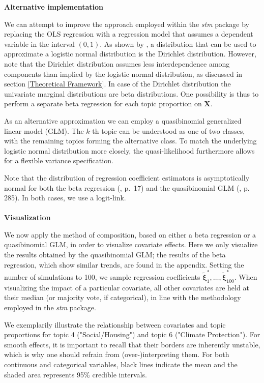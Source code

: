 \noindent \textbf{Alternative implementation} \vspace{10px}

\noindent We can attempt to improve the approach employed within the \textit{stm} package by replacing the OLS regression with a regression model that assumes a dependent variable in the interval $(0,1)$. As shown by \cite{atchison1980logistic}, a distribution that can be used to approximate a logistic normal distribution is the Dirichlet distribution. However, note that the Dirichlet distribution assumes less interdependence among components than implied by the logistic normal distribution, as discussed in section \ref{Theoretical Framework}. In case of the Dirichlet distribution the univariate marginal distributions are beta distributions. One possibility is thus to perform a separate beta regression for each topic proportion on $\boldsymbol{X}$. 

As an alternative approximation we can employ a quasibinomial generalized linear model (GLM). The $k$-th topic can be understood as one of two classes, with the remaining topics forming the alternative class. To match the underlying logistic normal distribution more closely, the quasi-likelihood furthermore allows for a flexible variance specification. 

Note that the distribution of regression coefficient estimators is asymptotically normal for both the beta regression (\citealp{ferrari2004beta}, p.\ 17) and the quasibinomial GLM (\citealp{fahrmeir2007regression}, p. 285). In both cases, we use a logit-link. \\
\\
\noindent \textbf{Visualization} \vspace{10px}

\noindent We now apply the method of composition, based on either a beta regression or a quasibinomial GLM, in order to visualize covariate effects. Here we only visualize the results obtained by the quasibinomial GLM; the results of the beta regression, which show similar trends, are found in the appendix. Setting the number of simulations to 100, we sample regression coefficients $\tilde{\boldsymbol{\xi}}^*_1, \dots, \tilde{\boldsymbol{\xi}}^*_{100}$. When visualizing the impact of a particular covariate, all other covariates are held at their median (or majority vote, if categorical), in line with the methodology employed in the \textit{stm} package.

We exemplarily illustrate the relationship between covariates and topic proportions for topic 4 ("Social/Housing") and topic 6 ("Climate Protection"). For smooth effects, it is important to recall that their borders are inherently unstable, which is why one should refrain from (over-)interpreting them. For both continuous and categorical variables, black lines indicate the mean and the shaded area represents 95\% credible intervals.


